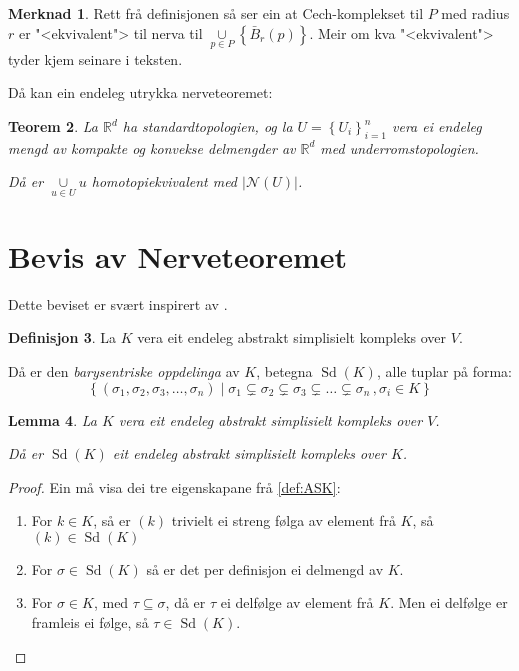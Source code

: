 \documentclass[a4paper, 12pt, norsk]{article}
\theoremstyle{plain}
\newtheorem{theorem}{Teorem}[section]
\newtheorem{lemma}[theorem]{Lemma}
\theoremstyle{definition}
\newtheorem{definition}[theorem]{Definisjon}
\newtheorem{remark}[theorem]{Merknad}
\newcommand{\Rb}{\mathbb{R}}
\newcommand{\Nc}{\mathcal{N}}
\newcommand{\union}{ \mathop{\cup}\limits }
\newcommand{\gr}[1]{ \lvert #1 \rvert } %
\newcommand{\set}[1]{ \left\{ #1 \right\} } %
\newcommand{\tuple}[1]{ \left( #1 \right) } %
\DeclareMathOperator{\Sd}{Sd} %
\begin{document}
\begin{remark} \label{rem:cech-ekvivalent}
	Rett frå definisjonen så ser ein at Cech-komplekset til $P$ med radius $r$ er "<ekvivalent"> til nerva til $\union_{p \in P} \left \{ \bar{B}_r(p) \right \}$. Meir om kva "<ekvivalent"> tyder kjem seinare i teksten.
\end{remark}

Då kan ein endeleg utrykka nerveteoremet:

\begin{theorem}
	La \( \Rb^d \) ha standardtopologien, og la \( U = \set{U_i}_{i=1}^n \) vera ei endeleg mengd av kompakte og konvekse delmengder av \( \Rb^d \) med underromstopologien.
	
	Då er \( \union_{u \in U} u \) homotopiekvivalent med \( \gr{\Nc(U)} \).
\end{theorem}

\section{Bevis av Nerveteoremet}

Dette beviset er svært inspirert av \cite[Kapittel 3]{https://doi.org/10.48550/arxiv.2203.03571}.

\begin{definition}
	La \( K \) vera eit endeleg abstrakt simplisielt kompleks over \( V \). 
	
	Då er den \emph{barysentriske oppdelinga} av \( K \), betegna \( \Sd(K) \), alle tuplar på forma: 
	\[
		\set{(\sigma_1, \sigma_2, \sigma_3, \dots, \sigma_n) \mid \sigma_1 \subsetneq \sigma_2 \subsetneq \sigma_3 \subsetneq \dots \subsetneq \sigma_n\,, \sigma_i \in K}
	\]
\end{definition}

\begin{lemma}
	La \( K \) vera eit endeleg abstrakt simplisielt kompleks over \( V \).
	
	Då er \( \Sd(K) \) eit endeleg abstrakt simplisielt kompleks over \( K \).
\end{lemma}

\begin{proof} \label{thm:subdivisjon-abstrakt-simplisielt-kompleks}
	Ein må visa dei tre eigenskapane frå \autoref{def:ASK}:
	\begin{enumerate}
		\item{ For \( k \in K \), så er \( \tuple{k} \) trivielt ei streng følga av element frå \( K \), så \( \tuple{k} \in \Sd(K) \) }
  		\item{ For \( \sigma \in \Sd(K) \) så er det per definisjon ei delmengd av \( K \). }
    	\item{ For \( \sigma \in K \), med \( \tau \subseteq \sigma \), då er \( \tau \) ei delfølge av element frå \( K \). Men ei delfølge er framleis ei følge, så \( \tau \in \Sd(K) \). }
	\end{enumerate}
\end{proof}
\end{document}
